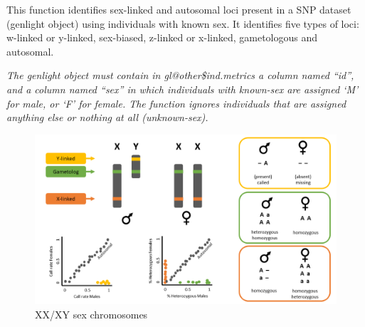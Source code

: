 \documentclass[
  letterpaper,
  DIV=11,
  numbers=noendperiod]{scrreprt}
\newenvironment{Shaded}{\begin{snugshade}}{\end{snugshade}}
\newcommand{\CommentTok}[1]{\textcolor[rgb]{0.38,0.63,0.69}{\textit{#1}}}
\newcommand{\FunctionTok}[1]{\textcolor[rgb]{0.02,0.16,0.49}{#1}}
\newcommand{\NormalTok}[1]{\textcolor[rgb]{0.00,0.44,0.13}{#1}}
\newcommand{\SpecialCharTok}[1]{\textcolor[rgb]{0.25,0.44,0.63}{#1}}
\let\textttOrig\texttt
\renewcommand{\texttt}[1]{\textttOrig{\color{blue}{#1}}}
\begin{document}
\markright{Run \texttt{filter.sex.linked}}

This function identifies sex-linked and autosomal loci present in a SNP
dataset (genlight object) using individuals with known sex. It
identifies five types of loci: w-linked or y-linked, sex-biased,
z-linked or x-linked, gametologous and autosomal.

\emph{The genlight object must contain in gl@other\$ind.metrics a column
named ``id'', and a column named ``sex'' in which individuals with
known-sex are assigned `M' for male, or `F' for female. The function
ignores individuals that are assigned anything else or nothing at all
(unknown-sex).}

\begin{figure}

{\centering \includegraphics{images/XY.png}

}

\caption{XX/XY sex chromosomes}

\end{figure}

\begin{Shaded}
\end{Shaded}
\end{document}
